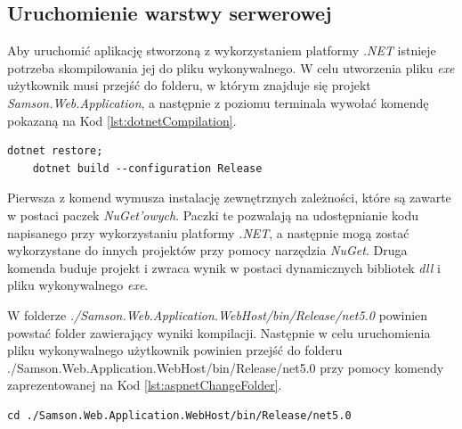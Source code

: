 \documentclass[a4paper,twoside,12pt]{book}
\begin{document}
\subsection{Uruchomienie warstwy serwerowej}
Aby uruchomić aplikację stworzoną z wykorzystaniem platformy \textit{.NET} istnieje potrzeba skompilowania jej do pliku wykonywalnego. W celu utworzenia pliku \textit{exe} użytkownik musi przejść do folderu, w którym znajduje się projekt \textit{Samson.Web.Application}, a następnie z poziomu terminala wywołać komendę pokazaną na Kod \ref{lst:dotnetCompilation}.
\begin{lstlisting}[caption={Kompilacja projektu \textit{ASP.NET}}, label={lst:dotnetCompilation}]
	dotnet restore;
	dotnet build --configuration Release
\end{lstlisting}
Pierwsza z komend wymusza instalację zewnętrznych zależności, które są zawarte w postaci paczek \textit{NuGet'owych}. Paczki te pozwalają na udostępnianie kodu napisanego przy wykorzystaniu platformy \textit{.NET}, a następnie mogą zostać wykorzystane do innych projektów przy pomocy narzędzia \textit{NuGet}. Druga komenda buduje projekt i zwraca wynik w postaci dynamicznych bibliotek \textit{dll} i pliku wykonywalnego \textit{exe}.

W folderze \textit{./Samson.Web.Application.WebHost/bin/Release/net5.0} powinien powstać folder zawierający wyniki kompilacji. Następnie w celu uruchomienia pliku wykonywalnego użytkownik powinien przejść do folderu \\ ./Samson.Web.Application.WebHost/bin/Release/net5.0 przy pomocy komendy zaprezentowanej na Kod \ref{lst:aspnetChangeFolder}.
\begin{lstlisting}[caption={Przejście do folderu zawierającego plik wykonywalny}, label={lst:aspnetChangeFolder}]
	cd ./Samson.Web.Application.WebHost/bin/Release/net5.0
\end{lstlisting}
\end{document}
